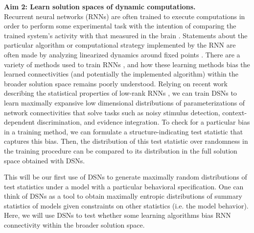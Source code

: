 \documentclass[11pt]{article}
\begin{document}
\textbf{Aim 2: Learn solution spaces of dynamic computations.} \\
Recurrent neural networks (RNNs) are often trained to execute computations in order to perform some experimental task with the intention of comparing the trained system's activity with that measured in the brain \cite{sussillo2014neural}.  Statements about the particular algorithm or computational strategy implemented by the RNN are often made by analyzing linearized dynamics around fixed points \cite{sussillo2013opening}.  There are a variety of methods used to train RNNs \cite{werbos1990backpropagation, sussillo2009generating, martens2011learning, depasquale2018full}, and how these learning methods bias the learned connectivities (and potentially the implemented algorithm) within the broader solution space remains poorly understood.  Relying on recent work describing the statistical properties of low-rank RNNs \cite{mastrogiuseppe2018linking}, we can train DSNs to learn maximally expansive low dimensional distributions of parameterizations of network connectivities that solve tasks such as noisy stimulus detection, context-dependent discrimination, and evidence integration.  To check for a particular bias in a training method, we can formulate a structure-indicating test statistic that captures this bias.  Then, the distribution of this test statistic over randomness in the training procedure can be compared to its distribution in the full solution space obtained with DSNs.

This will be our first use of DSNs to generate maximally random distributions of test statistics under a model with a particular behavioral specification.  One can think of DSNs as a tool to obtain maximally entropic distributions of summary statistics of models given constraints on other statistics (i.e. the model behavior).  Here, we will use DSNs to test whether some learning algorithms bias RNN connectivity within the broader solution space. 
\end{document}
